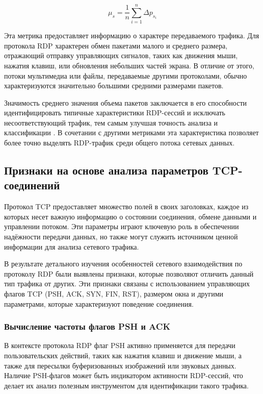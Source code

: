 \documentclass[spec, och, diploma]{SCWorks}
\begin{document}
\begin{equation}
  \mu_s = \frac{1}{n} \sum_{i=1}^{n} \Delta p_{s_i}
\end{equation}

Эта метрика предоставляет информацию о характере передаваемого трафика. Для протокола RDP характерен обмен пакетами малого и среднего 
размера, отражающий отправку управляющих сигналов, таких как движения мыши, нажатия клавиш, или обновления небольших частей экрана. В 
отличие от этого, потоки мультимедиа или файлы, передаваемые другими протоколами, обычно характеризуются значительно большими средними 
размерами пакетов.

Значимость среднего значения объема пакетов заключается в его способности идентифицировать типичные характеристики RDP-сессий и исключать 
несоответствующий трафик, тем самым улучшая точность анализа и классификации \cite{lib2, lib3}. В сочетании с другими метриками эта характеристика позволяет 
более точно выделять RDP-трафик среди общего потока сетевых данных.

\subsection{Признаки на основе анализа параметров TCP-соединений}

Протокол TCP предоставляет множество полей в своих заголовках, каждое из которых несет важную информацию о состоянии соединения, обмене данными и 
управлении потоком. Эти параметры играют ключевую роль в обеспечении надёжности передачи данных, но также могут служить источником ценной информации 
для анализа сетевого трафика.

В результате детального изучения особенностей сетевого взаимодействия по протоколу RDP были выявлены признаки, которые позволяют отличить данный 
тип трафика от других. Эти признаки связаны с использованием управляющих флагов TCP (PSH, ACK, SYN, FIN, RST), размером окна и другими параметрами, 
которые характеризуют поведение соединения.


\subsubsection{Вычисление частоты флагов PSH и ACK}

В контексте протокола RDP флаг PSH активно применяется для передачи пользовательских действий, таких как нажатия клавиш и движение мыши, 
а также для пересылки буферизованных изображений или звуковых данных. Наличие PSH-флагов может быть индикатором активности RDP-сессий, 
что делает их анализ полезным инструментом для идентификации такого трафика.
\end{document}
